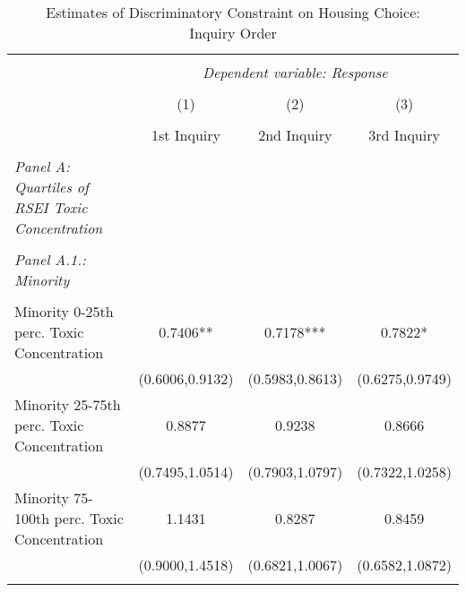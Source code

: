                                   \begin{table}[H]                                         \scriptsize \centering                                         \begin{threeparttable}                                         \captionsetup{justification=centering}                                           \caption{Estimates of Discriminatory Constraint on Housing Choice: \\ Inquiry Order}                                           \label{tab:inqorder}                                          \begin{tabular}{@{\extracolsep{5pt}}lccc}                                         \\[-1.8ex]\hline                                         \hline \\[-1.8ex]                                          & \multicolumn{3}{c}{\textit{Dependent variable: {\it  Response}}} \\                                          \cline{2-4}                                         \\[-1.8ex] & (1) & (2) & (3) \\                                         \\[-1.8ex] &  1st Inquiry & 2nd Inquiry & 3rd Inquiry\\                                         \hline \\[-1.8ex]                                         {\it Panel A: Quartiles of RSEI Toxic Concentration}\\                                          \hline \\[-1.8ex]        
{\it Panel A.1.: Minority } \\                                 &  &  &    \\
Minority 0-25th perc. Toxic Concentration&      0.7406** &      0.7178***&      0.7822*  \\
                    &(0.6006,0.9132)   &(0.5983,0.8613)   &(0.6275,0.9749)   \\
Minority 25-75th perc. Toxic Concentration&      0.8877   &      0.9238   &      0.8666   \\
                    &(0.7495,1.0514)   &(0.7903,1.0797)   &(0.7322,1.0258)   \\
Minority 75-100th perc. Toxic Concentration&      1.1431   &      0.8287   &      0.8459   \\
                    &(0.9000,1.4518)   &(0.6821,1.0067)   &(0.6582,1.0872)   \\
       \hline \\[-1.8ex] 
         

\end{tabular}
\end{threeparttable}
\end{table}
